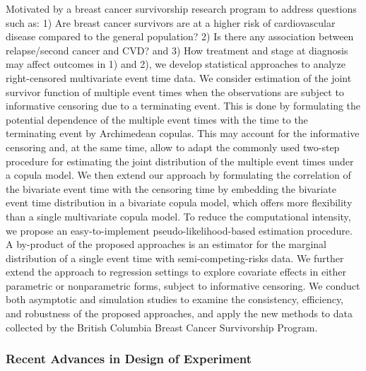 \begin{itemize}
Motivated by a breast cancer survivorship research program to address questions such as: 1) Are breast cancer survivors are at a higher risk of cardiovascular disease compared to the general population? 2) Is there any association between relapse/second cancer and CVD? and 3) How treatment and stage at diagnosis may affect outcomes in 1) and 2), we develop statistical approaches to analyze right-censored multivariate event time data. We consider estimation of the joint survivor function of multiple event times when the observations are subject to informative censoring due to a terminating event. This is done by formulating the potential dependence of the multiple event times with the time to the terminating event by Archimedean copulas. This may account for the informative censoring and, at the same time, allow to adapt the commonly used two-step procedure for estimating the joint distribution of the multiple event times under a copula model. We then extend our approach by formulating the correlation of the bivariate event time with the censoring time by embedding the bivariate event time distribution in a bivariate copula model, which offers more flexibility than a single multivariate copula model. To reduce the computational intensity, we propose an easy-to-implement pseudo-likelihood-based estimation procedure. A by-product of the proposed approaches is an estimator for the marginal distribution of a single event time with semi-competing-risks data. We further extend the approach to regression settings to explore covariate effects in either parametric or nonparametric forms, subject to informative censoring. We conduct both asymptotic and simulation studies to examine the consistency, efficiency, and robustness of the proposed approaches, and apply the new methods to data collected by the British Columbia Breast Cancer Survivorship Program.

\end{itemize}

\subsubsection*{Recent Advances in Design of Experiment}

